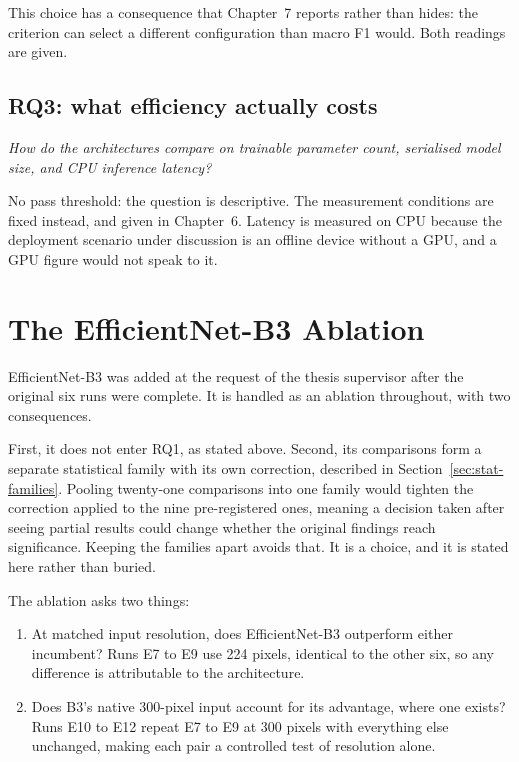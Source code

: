 This choice has a consequence that Chapter~7 reports rather than hides: the criterion
can select a different configuration than macro F1 would. Both readings are given.

\subsection*{RQ3: what efficiency actually costs}

\emph{How do the architectures compare on trainable parameter count, serialised model
size, and CPU inference latency?}

No pass threshold: the question is descriptive. The measurement conditions are fixed
instead, and given in Chapter~6. Latency is measured on CPU because the deployment
scenario under discussion is an offline device without a GPU, and a GPU figure would not
speak to it.

\section{The EfficientNet-B3 Ablation}
\label{sec:ablation}

EfficientNet-B3 was added at the request of the thesis supervisor after the original six
runs were complete. It is handled as an ablation throughout, with two consequences.

First, it does not enter RQ1, as stated above. Second, its comparisons form a separate
statistical family with its own correction, described in Section~\ref{sec:stat-families}.
Pooling twenty-one comparisons into one family would tighten the correction applied to
the nine pre-registered ones, meaning a decision taken after seeing partial results
could change whether the original findings reach significance. Keeping the families
apart avoids that. It is a choice, and it is stated here rather than buried.

The ablation asks two things:

\begin{enumerate}
  \item At matched input resolution, does EfficientNet-B3 outperform either incumbent?
        Runs E7 to E9 use 224 pixels, identical to the other six, so any difference is
        attributable to the architecture.
  \item Does B3's native 300-pixel input account for its advantage, where one exists?
        Runs E10 to E12 repeat E7 to E9 at 300 pixels with everything else unchanged,
        making each pair a controlled test of resolution alone.
\end{enumerate}


